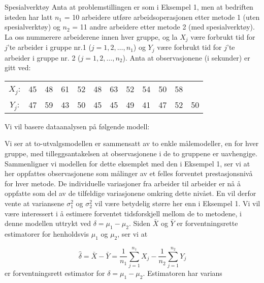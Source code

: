 \begin{eksempel}{Spesialverktøy}
Anta at problemstillingen er som i Eksempel 1, men at bedriften isteden
har latt $n_1$ = 10 arbeidere utføre arbeidsoperasjonen etter metode
1 (uten spesialverktøy) og $n_2$ = 11 andre arbeidere etter metode 2
(med spesialverktøy).  La oss nummerere arbeiderene innen hver
gruppe, og la $X_j$ være forbrukt tid for $j$'te arbeider i gruppe
nr.1 ($j = 1, 2, \ldots, n_1$) og $Y_j$ være forbrukt tid for 
$j$'te arbeider i gruppe nr. 2 ($j = 1, 2, \ldots, n_2$). 
Anta at observasjonene (i sekunder) er gitt ved:
\begin{center}
\begin{tabular}{cccccccccccc}
$X_j$:& 45  &  48  &  61  &  52  &  48  &  63  &  52  &  54  &  50  &  58 &\\
$Y_j$:& 47  &  59  &  43  &  50  &  45  &  45  &  49  &  41  &  47  &  52 & 50
\end{tabular}
\end{center}
Vi vil basere dataanalysen på følgende modell:
\begin{center}  \end{center}
Vi ser at to-utvalgsmodellen er sammensatt av to enkle 
målemodeller, en for hver gruppe, med tilleggsantakelsen at
observasjonene i de to gruppene er uavhengige.
Sammenligner vi modellen for dette eksemplet med den i Eksempel 1,
ser vi at her oppfattes observasjonene
som målinger av et felles forventet prestasjonsnivå for hver
metode.  De individuelle variasjoner fra arbeider til arbeider er nå
å oppfatte som del av de tilfeldige variasjonene omkring dette
nivået.  En vil derfor vente at variansene ${\sigma}_1^2$ og
${\sigma}_2^2$ vil være betydelig større her enn i Eksempel 1.
Vi vil være interessert i å estimere forventet
tidsforskjell mellom de to metodene, i denne modellen uttrykt ved
$\delta = {\mu}_1 - {\mu}_2$.  Siden $\bar{X}$ og $\bar{Y}$ er
forventningsrette estimatorer for henholdsvis ${\mu}_1$ og ${\mu}_2$, ser vi at

\[ \hat{\delta}=\bar{X}-\bar{Y}=\frac{1}{n_1} \sum_{j=1}^{n_1} X_j-
                                  \frac{1}{n_2} \sum_{j=1}^{n_2} Y_j \]
er forventningsrett estimator for $\delta = {\mu}_1 - {\mu}_2$.
Estimatoren har varians


\end{eksempel}
